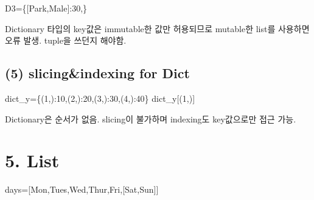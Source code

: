 \documentclass[
  letterpaper,
  DIV=11,
  numbers=noendperiod]{scrreprt}
\newenvironment{Shaded}{\begin{snugshade}}{\end{snugshade}}
\newcommand{\DecValTok}[1]{\textcolor[rgb]{0.68,0.00,0.00}{#1}}
\newcommand{\NormalTok}[1]{\textcolor[rgb]{0.00,0.23,0.31}{#1}}
\newcommand{\OperatorTok}[1]{\textcolor[rgb]{0.37,0.37,0.37}{#1}}
\newcommand{\StringTok}[1]{\textcolor[rgb]{0.13,0.47,0.30}{#1}}
\begin{document}
\begin{Shaded}
\begin{Highlighting}[]
\NormalTok{D3}\OperatorTok{=}\NormalTok{\{[}\StringTok{\textquotesingle{}Park\textquotesingle{}}\NormalTok{,}\StringTok{\textquotesingle{}Male\textquotesingle{}}\NormalTok{]:}\DecValTok{30}\NormalTok{,\}}
\end{Highlighting}
\end{Shaded}

Dictionary 타입의 key값은 immutable한 값만 허용되므로 mutable한 list를
사용하면 오류 발생. tuple을 쓰던지 해야함.

\subsection*{(5) slicing\&indexing for
Dict}\label{slicingindexing-for-dict}

\begin{Shaded}
\begin{Highlighting}[]
\NormalTok{dict\_y}\OperatorTok{=}\NormalTok{\{(}\DecValTok{1}\NormalTok{,):}\DecValTok{10}\NormalTok{,(}\DecValTok{2}\NormalTok{,):}\DecValTok{20}\NormalTok{,(}\DecValTok{3}\NormalTok{,):}\DecValTok{30}\NormalTok{,(}\DecValTok{4}\NormalTok{,):}\DecValTok{40}\NormalTok{\}}
\NormalTok{dict\_y[(}\DecValTok{1}\NormalTok{,)]}
\end{Highlighting}
\end{Shaded}

Dictionary은 순서가 없음. slicing이 불가하며 indexing도 key값으로만 접근
가능.

\section*{5. List}\label{list}


\begin{Shaded}
\begin{Highlighting}[]
\NormalTok{days}\OperatorTok{=}\NormalTok{[}\StringTok{\textquotesingle{}Mon\textquotesingle{}}\NormalTok{,}\StringTok{\textquotesingle{}Tues\textquotesingle{}}\NormalTok{,}\StringTok{\textquotesingle{}Wed\textquotesingle{}}\NormalTok{,}\StringTok{\textquotesingle{}Thur\textquotesingle{}}\NormalTok{,}\StringTok{\textquotesingle{}Fri\textquotesingle{}}\NormalTok{,[}\StringTok{\textquotesingle{}Sat\textquotesingle{}}\NormalTok{,}\StringTok{\textquotesingle{}Sun\textquotesingle{}}\NormalTok{]]}
\end{Highlighting}
\end{Shaded}
\end{document}
